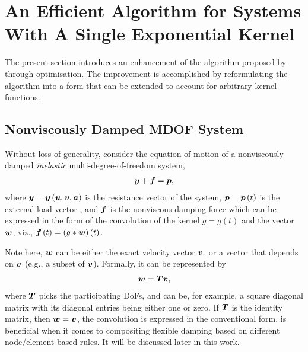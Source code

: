 \section{An Efficient Algorithm for Systems With A Single Exponential Kernel}\label{sec:single}
The present section introduces an enhancement of the algorithm proposed by \citet{Adhikari2004} through optimisation. The improvement is accomplished by reformulating the algorithm into a form that can be extended to account for arbitrary kernel functions.
\subsection{Nonviscously Damped MDOF System}
Without loss of generality, consider the equation of motion of a nonviscously damped \textit{inelastic} multi-degree-of-freedom system,
\begin{gather}\label{eq:eom}
\bm{y}+\bm{f}=\bm{p},
\end{gather}
where $\bm{y}=\bm{y}\left(\bm{u},\bm{v},\bm{a}\right)$ is the resistance vector of the system, $\bm{p}=\bm{p}\left(t\right)$ is the external load vector , and $\bm{f}$ is the nonviscous damping force which can be expressed in the form of the convolution of the kernel $g=g\left(t\right)$ and the vector $\bm{w}$, viz., $\bm{f}\left(t\right)=\left(g*\bm{w}\right)\left(t\right)$.

Note here, $\bm{w}$ can be either the exact velocity vector $\bm{v}$, or a vector that depends on $\bm{v}$ (e.g., a subset of $\bm{v}$). Formally, it can be represented by
\begin{gather}\label{eq:wv}
\bm{w}=\bm{T}\bm{v},
\end{gather}
where $\bm{T}$ picks the participating DoFs, and can be, for example, a square diagonal matrix with its diagonal entries being either one or zero. If $\bm{T}$ is the identity matrix, then $\bm{w}=\bm{v}$, the convolution is expressed in the conventional form.  is beneficial when it comes to compositing flexible damping based on different node/element-based rules. It will be discussed later in this work.
